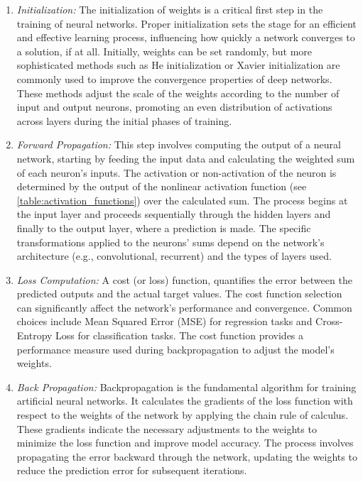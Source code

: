 \begin{enumerate}
    \item \emph{Initialization:} The initialization of weights is a critical first step in the training of neural networks. Proper initialization sets the stage for
          an efficient and effective learning process, influencing how quickly a network converges to a solution, if at all. Initially, weights can be set randomly,
          but more sophisticated methods such as He initialization or Xavier initialization are commonly used to improve the convergence properties of deep networks\cite{goodfellowDeepLearning2016}.
          These methods adjust the scale of the weights according to the number of input and output neurons, promoting an even
          distribution of activations across layers during the initial phases of training\cite{narkhedeReviewWeightInitialization2022}.

    \item \emph{Forward Propagation:} This step involves computing the output of a neural network, starting by feeding the input data and calculating the weighted
          sum of each neuron's inputs. The activation or non-activation of the neuron is determined by the output of the nonlinear activation function (see \cref{table:activation_functions})
          over the calculated sum. The process begins at the input layer and proceeds sequentially through the hidden layers and finally to the output layer, where a
          prediction is made. The specific transformations applied to the neurons' sums depend on the network's architecture (e.g., convolutional, recurrent) and the types
          of layers used\cite{nielsenNeuralNetworksDeep}.

    \item \emph{Loss Computation:} A cost (or loss) function, quantifies the error between the predicted outputs and the actual target values.
          The cost function selection can significantly affect the network's performance and convergence. Common choices include Mean Squared Error (MSE) for regression
          tasks and Cross-Entropy Loss for classification tasks. The cost function provides a performance measure used during backpropagation to adjust the model’s weights.

    \item \emph{Back Propagation:} Backpropagation is the fundamental algorithm for training artificial neural networks. It calculates the gradients of the loss function
          with respect to the weights of the network by applying the chain rule of calculus. These gradients indicate the necessary adjustments to the weights to
          minimize the loss function and improve model accuracy. The process involves propagating the error backward through the network, updating the weights to
          reduce the prediction error for subsequent iterations\cite{cilimkovicNeuralNetworksBack}.


\end{enumerate}
